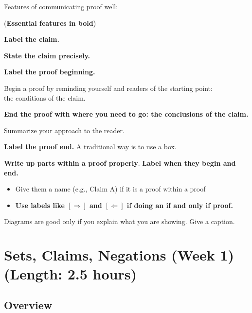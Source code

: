 \documentclass[11pt]{article}
\theoremstyle{definition}
\begin{document}
\begin{minipage}{5.5in}
\begin{mdframed}\raggedright\parskip2pt
Features of communicating proof well:

({\bf Essential features in bold})

\begin{enumerate*}
\item {\bf Label the claim.}
\item {\bf State the claim precisely.}
\item {\bf Label the proof beginning.}
\item Begin a proof by reminding yourself and readers of the starting point:\\ the conditions of the claim.
\item {\bf End the proof with where you need to go: the conclusions of the claim.}
\item Summarize your approach to the reader. 
\item {\bf Label the proof end.} A traditional way is to use a box.
\item {\bf Write up parts within a proof properly}. {\bf Label when they begin and end.}
	\begin{itemize} 
	\item Give them a name (e.g., Claim A) if it is a proof within a proof
	\item {\bf Use labels like $[\Rightarrow]$ and $[\Leftarrow]$ if doing an if and only if proof.}
	\end{itemize}

\item Diagrams are good only if you explain what you are showing. Give a caption.
\end{enumerate*}
\end{mdframed}
\end{minipage}

\newpage
\section{Sets, Claims, Negations (Week 1) (Length: 2.5 hours)}  %
\label{s: sets}
\subsection{Overview}
 
\end{document}
